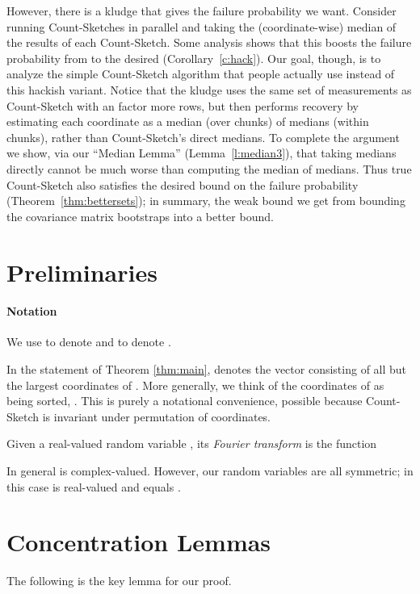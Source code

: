 \documentclass[letterpaper,11pt]{article}
\begin{document}
However, there is a kludge that gives the  failure
probability we want.  Consider running  Count-Sketches in parallel
and taking the (coordinate-wise) median of the results of each Count-Sketch.
Some analysis shows that this boosts the failure probability from
 to the desired  (Corollary~\ref{c:hack}).
Our goal, though, is to analyze the simple Count-Sketch algorithm that
people actually use instead of this hackish variant.  Notice that the kludge uses the
same set of measurements as Count-Sketch with an  factor more rows,
but then performs recovery by estimating each coordinate as a median
(over chunks) of medians (within chunks), rather than Count-Sketch's direct
medians.  To complete the argument we show, via our ``Median Lemma''
(Lemma~\ref{l:median3}), that taking medians directly cannot be much worse
than computing the median of medians.  Thus true Count-Sketch also satisfies
the desired  bound on the failure probability
(Theorem~\ref{thm:bettersets}); in summary, the weak bound we get from
bounding the covariance matrix bootstraps into a better bound.



\section{Preliminaries}

\paragraph{Notation}
We use  to denote  and  to denote .

In the statement of Theorem \ref{thm:main},
 denotes the vector consisting of all but
the largest  coordinates of .  More generally,
we think of the coordinates of  as being sorted,
.
This is purely a notational convenience, possible because Count-Sketch is
invariant under permutation of coordinates.

Given a real-valued random variable , its
\emph{Fourier transform} is the function

In general  is complex-valued.  However, our random
variables are all symmetric; in this case  is
real-valued and equals .

\section{Concentration Lemmas}

The following is the key lemma for our proof.
\end{document}
